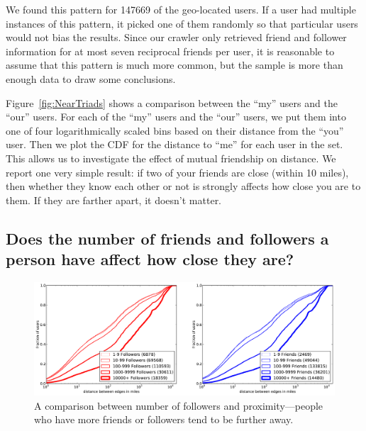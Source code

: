 
We found this pattern for 147669 of the geo-located users.
If a user had multiple instances of this pattern, it picked one of them
randomly so that particular users would not bias the results.
Since our crawler only retrieved friend and follower information for at most
seven reciprocal friends per user, it is reasonable to assume that this pattern
is much more common, but the sample is more than enough data to draw some
conclusions.

Figure~\ref{fig:NearTriads} shows a comparison between the ``my'' users and the
``our'' users.
For each of the ``my'' users and the ``our'' users, we put them into one of
four logarithmically scaled bins based on their distance from the ``you'' user.
Then we plot the CDF for the distance to ``me'' for each user in the set. This
allows us to investigate the effect of mutual friendship on distance.
We report one very simple result: if two of your friends are close (within 10
miles), then whether they know each other or not is strongly affects how close
you are to them. If they are farther apart, it doesn't matter.

\subsection{Does the number of friends and followers a person have affect how
close they are?}

\begin{figure}[tb]
\centering
\includegraphics[width=\linewidth]{figures/edge_counts.pdf}
\caption{
A comparison between number of followers and proximity---people who have more
friends or followers tend to be further away.
}
\label{fig:EdgeCounts}
\end{figure}


